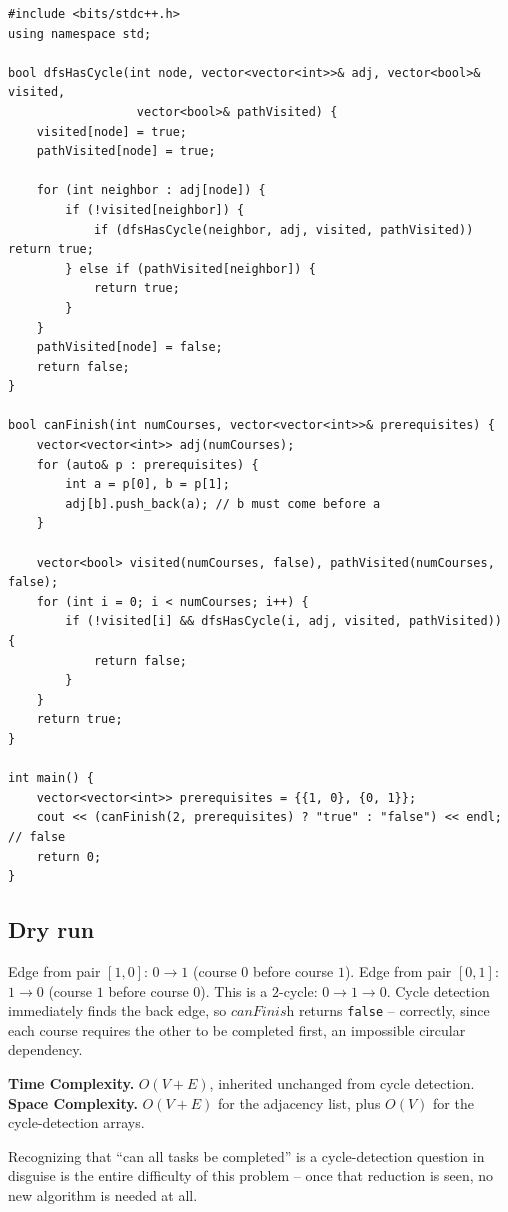 \begin{lstlisting}
#include <bits/stdc++.h>
using namespace std;

bool dfsHasCycle(int node, vector<vector<int>>& adj, vector<bool>& visited,
                  vector<bool>& pathVisited) {
    visited[node] = true;
    pathVisited[node] = true;

    for (int neighbor : adj[node]) {
        if (!visited[neighbor]) {
            if (dfsHasCycle(neighbor, adj, visited, pathVisited)) return true;
        } else if (pathVisited[neighbor]) {
            return true;
        }
    }
    pathVisited[node] = false;
    return false;
}

bool canFinish(int numCourses, vector<vector<int>>& prerequisites) {
    vector<vector<int>> adj(numCourses);
    for (auto& p : prerequisites) {
        int a = p[0], b = p[1];
        adj[b].push_back(a); // b must come before a
    }

    vector<bool> visited(numCourses, false), pathVisited(numCourses, false);
    for (int i = 0; i < numCourses; i++) {
        if (!visited[i] && dfsHasCycle(i, adj, visited, pathVisited)) {
            return false;
        }
    }
    return true;
}

int main() {
    vector<vector<int>> prerequisites = {{1, 0}, {0, 1}};
    cout << (canFinish(2, prerequisites) ? "true" : "false") << endl; // false
    return 0;
}
\end{lstlisting}

\subsection*{Dry run}


Edge from pair $[1,0]$: $0 \to 1$ (course $0$ before course $1$).
Edge from pair $[0,1]$: $1 \to 0$ (course $1$ before course $0$).
This is a $2$-cycle: $0 \to 1 \to 0$. Cycle detection immediately
finds the back edge, so $\textit{canFinish}$ returns \texttt{false} --
correctly, since each course requires the other to be completed first,
an impossible circular dependency.

\begin{complexitybox}
\textbf{Time Complexity.} $O(V+E)$, inherited unchanged from cycle
detection.
\textbf{Space Complexity.} $O(V+E)$ for the adjacency list, plus
$O(V)$ for the cycle-detection arrays.
\end{complexitybox}

\begin{takeawaybox}
Recognizing that ``can all tasks be completed'' is a cycle-detection
question in disguise is the entire difficulty of this problem -- once
that reduction is seen, no new algorithm is needed at all.
\end{takeawaybox}
